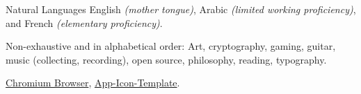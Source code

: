 \documentclass[10pt,a4paper]{article}
\begin{document}
\inlineheadsection 
{Natural Languages}
{English \textit{(mother tongue)}, Arabic \textit{(limited working proficiency)}, and French \textit{(elementary proficiency)}.}


\spacedhrule{1.6em}{-0.4em} %



\inlineheadsection %
{Non-exhaustive and in alphabetical order:}
{Art, cryptography, gaming, guitar, music (collecting, recording), open source, philosophy, reading, typography.}


\spacedhrule{1.6em}{-0.4em} %



{\href{http://www.chromium.org}{Chromium Browser}, \href{https://github.com/theherk/App-Icon-Template}{App-Icon-Template}.}

\end{document}

